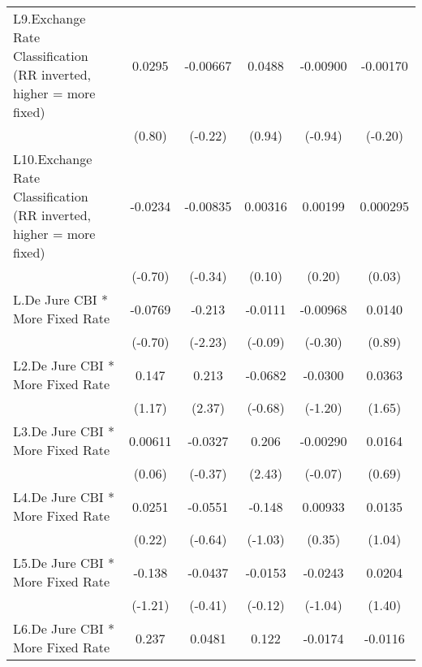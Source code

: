 {\begin{tabular*}{\linewidth}{@{\hskip\tabcolsep\extracolsep\fill}l*{5}{c}}
\addlinespace
L9.Exchange Rate Classification (RR inverted, higher = more fixed)&   0.0295         & -0.00667         &   0.0488         & -0.00900         & -0.00170         \\
                &   (0.80)         &  (-0.22)         &   (0.94)         &  (-0.94)         &  (-0.20)         \\
\addlinespace
L10.Exchange Rate Classification (RR inverted, higher = more fixed)&  -0.0234         & -0.00835         &  0.00316         &  0.00199         & 0.000295         \\
                &  (-0.70)         &  (-0.34)         &   (0.10)         &   (0.20)         &   (0.03)         \\
\addlinespace
L.De Jure CBI * More Fixed Rate&  -0.0769         &   -0.213\sym{*}  &  -0.0111         & -0.00968         &   0.0140         \\
                &  (-0.70)         &  (-2.23)         &  (-0.09)         &  (-0.30)         &   (0.89)         \\
\addlinespace
L2.De Jure CBI * More Fixed Rate&    0.147         &    0.213\sym{*}  &  -0.0682         &  -0.0300         &   0.0363         \\
                &   (1.17)         &   (2.37)         &  (-0.68)         &  (-1.20)         &   (1.65)         \\
\addlinespace
L3.De Jure CBI * More Fixed Rate&  0.00611         &  -0.0327         &    0.206\sym{*}  & -0.00290         &   0.0164         \\
                &   (0.06)         &  (-0.37)         &   (2.43)         &  (-0.07)         &   (0.69)         \\
\addlinespace
L4.De Jure CBI * More Fixed Rate&   0.0251         &  -0.0551         &   -0.148         &  0.00933         &   0.0135         \\
                &   (0.22)         &  (-0.64)         &  (-1.03)         &   (0.35)         &   (1.04)         \\
\addlinespace
L5.De Jure CBI * More Fixed Rate&   -0.138         &  -0.0437         &  -0.0153         &  -0.0243         &   0.0204         \\
                &  (-1.21)         &  (-0.41)         &  (-0.12)         &  (-1.04)         &   (1.40)         \\
\addlinespace
L6.De Jure CBI * More Fixed Rate&    0.237\sym{*}  &   0.0481         &    0.122         &  -0.0174         &  -0.0116         \\

\end{tabular*}}
